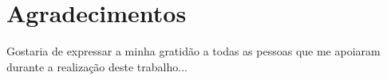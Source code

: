 \chapter*{Agradecimentos}
Gostaria de expressar a minha gratidão a todas as pessoas que me apoiaram durante a realização deste trabalho...